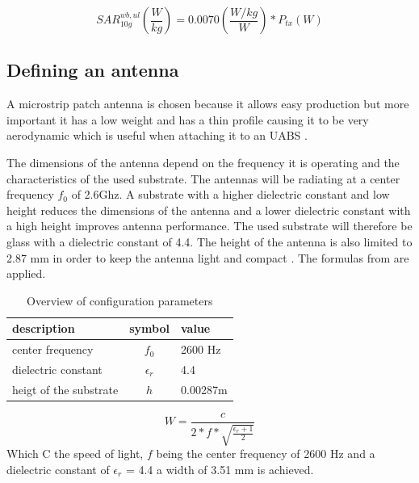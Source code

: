 \begin{equation} 
SAR^{wb,ul}_{10g} \left(\frac{W}{kg}\right) = 0.0070 \left(\frac{W/kg}{W}\right) * P_{tx} (W)
\label{eq:solve}
\end{equation}

\subsection{Defining an antenna}
\label{sub:definingAntenna}
A microstrip patch antenna is chosen because it allows easy production but more important it has a low weight and has a thin profile causing it to be very aerodynamic which is useful when attaching it to an \gls{UABS} \cite{J13_microstripadvantages}.

The dimensions of the antenna depend on the frequency it is operating and the characteristics of the used substrate.
The antennas will be radiating at a center frequency $f_0$ of 2.6Ghz. A substrate with a higher dielectric constant and low height reduces the dimensions of the antenna
and a lower dielectric constant with a high height improves antenna performance. The used substrate will therefore be glass with a dielectric constant of 4.4. The height of the antenna is also limited to 2.87 mm in order to keep the antenna light and compact \cite{J14_antennadesign}.
The formulas from \cite{J14_antennadesign} are \cite{J15_antennadesign} applied. 

\begin{table}[h!]
\centering
\begin{tabular}{|l|c|l|}
\hline
 description                & symbol          & value         \\    \hline
 center frequency       & $f_0$           & 2600 Hz       \\ 
 dielectric constant    & $\epsilon_r$    & 4.4         \\ 
 heigt of the substrate & $h$             & 0.00287m    \\ \hline
\end{tabular}
\caption{Overview of configuration parameters}
\end{table}

\begin{equation} 
W = \frac{c}{2*f*\sqrt{\frac{\epsilon_r+1}{2}}}
\end{equation}
Which C the speed of light, $f$ being the center frequency of 2600 Hz and a dielectric constant of $\epsilon_r$ = 4.4 a width of 3.51 mm is achieved.

